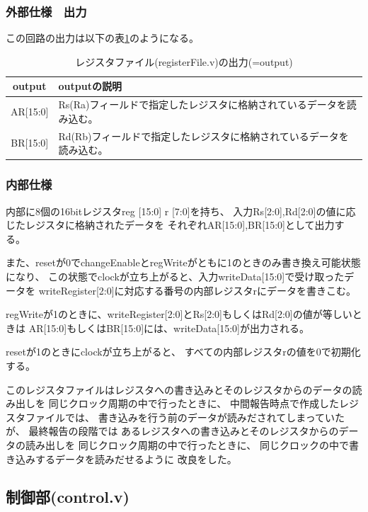 \documentclass[a4j,titlepage]{jarticle}
\begin{document}
\subsubsection{外部仕様　出力}
この回路の出力は以下の表\ref{registerFileO}のようになる。
\begin{table}[H]
    \caption{レジスタファイル(registerFile.v)の出力(=output)}
    \label{registerFileO}
    \begin{center}
    \begin {tabularx}{150mm}{|c|X|} \hline
         output & outputの説明 \\ \hline \hline
         AR[15:0] & Rs(Ra)フィールドで指定したレジスタに格納されているデータを読み込む。 \\ \hline
         BR[15:0] & Rd(Rb)フィールドで指定したレジスタに格納されているデータを読み込む。 \\ \hline
    \end {tabularx}
    \end{center}
\end{table}

\subsubsection{内部仕様}
内部に8個の16bitレジスタreg [15:0] r [7:0]を持ち、
入力Rs[2:0],Rd[2:0]の値に応じたレジスタに格納されたデータを
それぞれAR[15:0],BR[15:0]として出力する。

また、resetが0でchangeEnableとregWriteがともに1のときのみ書き換え可能状態になり、
この状態でclockが立ち上がると、入力writeData[15:0]で受け取ったデータを
writeRegister[2:0]に対応する番号の内部レジスタrにデータを書きこむ。

regWriteが1のときに、writeRegister[2:0]とRs[2:0]もしくはRd[2:0]の値が等しいときは
AR[15:0]もしくはBR[15:0]には、writeData[15:0]が出力される。

resetが1のときにclockが立ち上がると、
すべての内部レジスタrの値を0で初期化する。

このレジスタファイルはレジスタへの書き込みとそのレジスタからのデータの読み出しを
同じクロック周期の中で行ったときに、
中間報告時点で作成したレジスタファイルでは、
書き込みを行う前のデータが読みだされてしまっていたが、
最終報告の段階では
あるレジスタへの書き込みとそのレジスタからのデータの読み出しを
同じクロック周期の中で行ったときに、
同じクロックの中で書き込みするデータを読みだせるように
改良をした。






\newpage
\subsection{制御部(control.v)}
\end{document}
